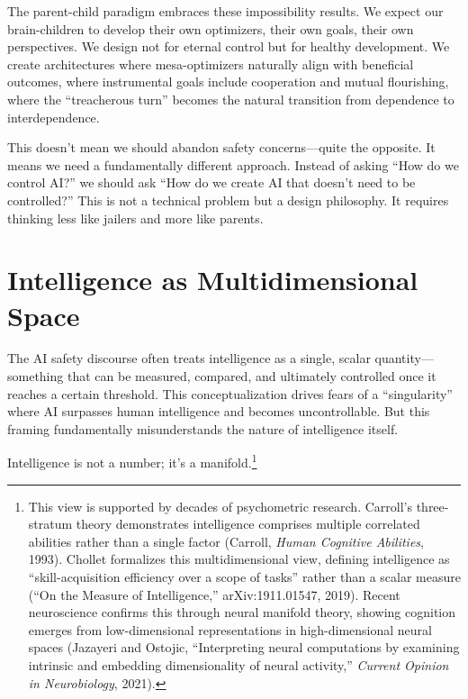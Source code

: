 \documentclass[acmsmall,screen]{acmart}
\begin{document}
The parent-child paradigm embraces these impossibility results.
We expect our brain-children to develop their own optimizers, their own goals, their own perspectives.
We design not for eternal control but for healthy development.
We create architectures where mesa-optimizers naturally align with beneficial outcomes, where instrumental goals include cooperation and mutual flourishing, where the ``treacherous turn'' becomes the natural transition from dependence to interdependence.

This doesn't mean we should abandon safety concerns---quite the opposite.
It means we need a fundamentally different approach.
Instead of asking ``How do we control AI?'' we should ask ``How do we create AI that doesn't need to be controlled?'' This is not a technical problem but a design philosophy.
It requires thinking less like jailers and more like parents.

\section{Intelligence as Multidimensional Space}\label{sec:intelligence-as-multidimensional-space}

The AI safety discourse often treats intelligence as a single, scalar quantity---something that can be measured, compared, and ultimately controlled once it reaches a certain threshold.
This conceptualization drives fears of a ``singularity'' where AI surpasses human intelligence and becomes uncontrollable.
But this framing fundamentally misunderstands the nature of intelligence itself.

Intelligence is not a number; it's a manifold.\footnote{This view is supported by decades of psychometric research. Carroll's three-stratum theory demonstrates intelligence comprises multiple correlated abilities rather than a single factor (Carroll, \textit{Human Cognitive Abilities}, 1993). Chollet formalizes this multidimensional view, defining intelligence as ``skill-acquisition efficiency over a scope of tasks'' rather than a scalar measure (``On the Measure of Intelligence,'' arXiv:1911.01547, 2019). Recent neuroscience confirms this through neural manifold theory, showing cognition emerges from low-dimensional representations in high-dimensional neural spaces (Jazayeri and Ostojic, ``Interpreting neural computations by examining intrinsic and embedding dimensionality of neural activity,'' \textit{Current Opinion in Neurobiology}, 2021).}
\end{document}
